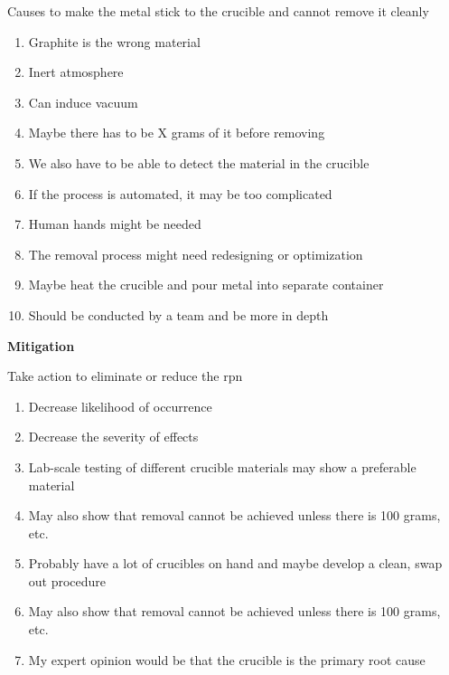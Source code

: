 \documentclass[aspectratio=1610,pdftex,dvipsnames,compress,xcolor={dvipsnames}]{beamer}
\newcommand{\acs}{\acrshort} %
\begin{document}
\begin{frame}{Causes to make the metal stick to the crucible and cannot remove it cleanly}
    \begin{enumerate}[series=outerlist,topsep=0pt,itemsep=5pt,leftmargin=*,label=(\arabic*)]
        \item[]Graphite is the wrong material  
        \item[]Inert atmosphere
        \item[]Can induce vacuum
        \item[]Maybe there has to be X grams of it before removing  
        \item[]We also have to be able to detect the material in the crucible
        \item[]If the process is automated, it may be too complicated   
        \item[]Human hands might be needed  
        \item[]The removal process might need redesigning or optimization
        \item[]Maybe heat the crucible and pour metal into separate container
        \item[]Should be conducted by a team and be more in depth
    \end{enumerate}
\end{frame}


\begin{frame}[plain]{}
    \centering\LARGE\textbf{Mitigation}
\end{frame}


\addtocounter{framenumber}{-1}
\begin{frame}{Take action to eliminate or reduce the \acs{rpn}}
    \begin{enumerate}[series=outerlist,topsep=0pt,itemsep=7pt,leftmargin=*,label=(\arabic*)]
        \item[]Decrease likelihood of occurrence
        \item[]Decrease the severity of effects
        \item[]Lab-scale testing of different crucible materials may show a preferable material  
        \item[]May also show that removal cannot be achieved unless there is 100 grams, etc.
        \item[]Probably have a lot of crucibles on hand and maybe develop a clean, swap out procedure  
        \item[]May also show that removal cannot be achieved unless there is 100 grams, etc.
        \item[]My expert opinion would be that the crucible is the primary root cause
    \end{enumerate}
\end{frame}
\end{document}
